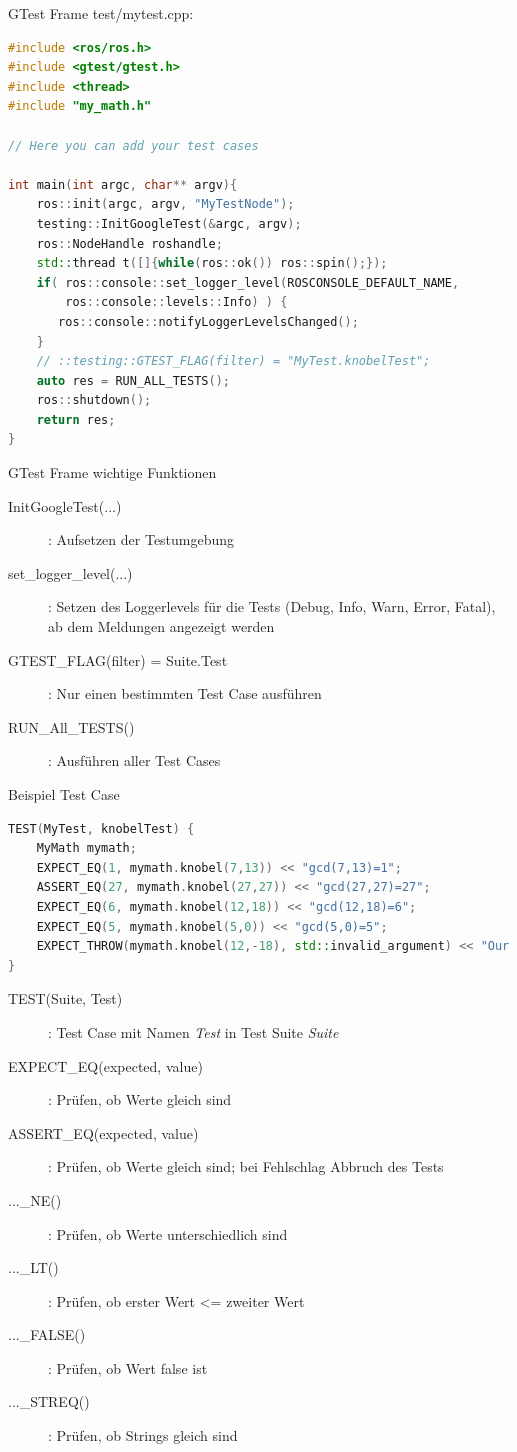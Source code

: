 \documentclass{beamer}
\begin{document}
\begin{frame}[fragile]{GTest Frame}
test/mytest.cpp:
\begin{lstlisting}[language=c++]
#include <ros/ros.h>
#include <gtest/gtest.h>
#include <thread>
#include "my_math.h"

// Here you can add your test cases

int main(int argc, char** argv){
    ros::init(argc, argv, "MyTestNode");
    testing::InitGoogleTest(&argc, argv);
    ros::NodeHandle roshandle;
    std::thread t([]{while(ros::ok()) ros::spin();});
    if( ros::console::set_logger_level(ROSCONSOLE_DEFAULT_NAME, 
    	ros::console::levels::Info) ) {
       ros::console::notifyLoggerLevelsChanged();
    }
    // ::testing::GTEST_FLAG(filter) = "MyTest.knobelTest";
    auto res = RUN_ALL_TESTS();
    ros::shutdown();
    return res;
}
\end{lstlisting}
\end{frame}

\begin{frame}{GTest Frame wichtige Funktionen}
\begin{description}
	\item[InitGoogleTest(...)]: Aufsetzen der Testumgebung
	\item[set\_logger\_level(...)]: Setzen des Loggerlevels für die Tests (Debug, Info, Warn, Error, Fatal), ab dem Meldungen angezeigt werden
	\item[GTEST\_FLAG(filter) = Suite.Test]: Nur einen bestimmten Test Case ausführen
	\item[RUN\_All\_TESTS()]: Ausführen aller Test Cases
\end{description}
\end{frame}

\begin{frame}[fragile]{Beispiel Test Case}
\begin{lstlisting}[language=c++]
TEST(MyTest, knobelTest) {
    MyMath mymath;
    EXPECT_EQ(1, mymath.knobel(7,13)) << "gcd(7,13)=1";
    ASSERT_EQ(27, mymath.knobel(27,27)) << "gcd(27,27)=27";
    EXPECT_EQ(6, mymath.knobel(12,18)) << "gcd(12,18)=6";
    EXPECT_EQ(5, mymath.knobel(5,0)) << "gcd(5,0)=5";
    EXPECT_THROW(mymath.knobel(12,-18), std::invalid_argument) << "Our gcd isn't defined for negative values";
}
\end{lstlisting}
\pause
\begin{description}
	\item[TEST(Suite, Test)]: Test Case mit Namen \textit{Test} in Test Suite \textit{Suite}
	\item[EXPECT\_EQ(expected, value)]: Prüfen, ob Werte gleich sind
	\item[ASSERT\_EQ(expected, value)]: Prüfen, ob Werte gleich sind; bei Fehlschlag Abbruch des Tests
	\item[...\_NE()]: Prüfen, ob Werte unterschiedlich sind
	\item[...\_LT()]: Prüfen, ob erster Wert <= zweiter Wert
	\item[...\_FALSE()]: Prüfen, ob Wert false ist
	\item[...\_STREQ()]: Prüfen, ob Strings gleich sind
\end{description}
\end{frame}
\end{document}
